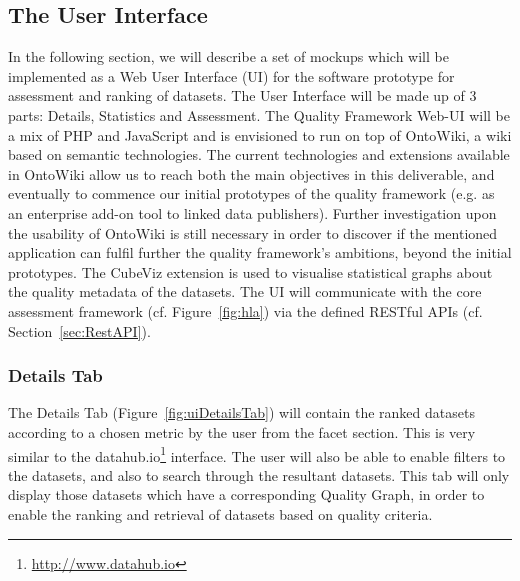 
\subsection{The User Interface}
\label{sec:UI} 
In the following section, we will describe a set of mockups which will be implemented as a Web User Interface (UI) for the software prototype for assessment and ranking of datasets.
The User Interface will be made up of 3 parts: Details, Statistics and Assessment.
The Quality Framework Web-UI will be a mix of PHP and JavaScript and is envisioned to run on top of OntoWiki, a wiki based on semantic technologies.
The current technologies and extensions available in OntoWiki allow us to reach both the main objectives in this deliverable, and eventually to commence our initial prototypes of the quality framework (e.g. as an enterprise add-on tool to linked data publishers).
Further investigation upon the usability of OntoWiki is still necessary in order to discover if the mentioned application can fulfil further the quality framework's ambitions, beyond the initial prototypes.
The CubeViz extension is used to visualise statistical graphs about the quality metadata of the datasets.
The UI will communicate with the core assessment framework (cf. Figure~\ref{fig:hla}) via the defined RESTful APIs (cf. Section~\ref{sec:RestAPI}).

\subsubsection{Details Tab}
The Details Tab (Figure~\ref{fig:uiDetailsTab}) will contain the ranked datasets according to a chosen metric by the user from the facet section. 
This is very similar to the datahub.io\footnote{\url{http://www.datahub.io}} interface. 
The user will also be able to enable filters to the datasets, and also to search through the resultant datasets. 
This tab will only display those datasets which have a corresponding Quality Graph, in order to enable the ranking and retrieval of datasets based on quality criteria.

